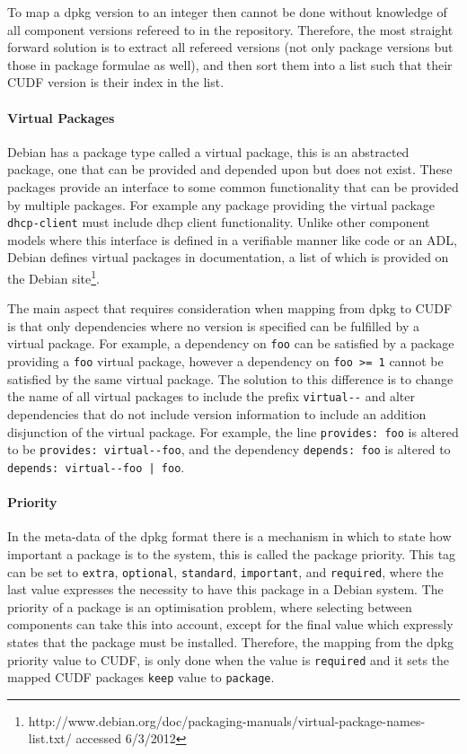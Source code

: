To map a dpkg version to an integer then cannot be done without knowledge of all component versions refereed to in the repository.
Therefore, the most straight forward solution is to extract all refereed versions (not only package versions but those in package formulae as well),
and then sort them into a list such that their CUDF version is their index in the list.

\paragraph{Virtual Packages}
Debian has a package type called a virtual package, this is an abstracted package, one that can be provided and depended upon but does not exist.
These packages provide an interface to some common functionality that can be provided by multiple packages.
For example any package providing the virtual package \verb+dhcp-client+ must include dhcp client functionality. 
Unlike other component models where this interface is defined in a verifiable manner like code or an ADL,
Debian defines virtual packages in documentation, a list of which is provided on the Debian site\footnote{http://www.debian.org/doc/packaging-manuals/virtual-package-names-list.txt/ accessed 6/3/2012}.

The main aspect that requires consideration when mapping from dpkg to CUDF is that only dependencies where no version is specified can be fulfilled by a virtual package.
For example, a dependency on \verb+foo+ can be satisfied by a package providing a \verb+foo+ virtual package, 
however a dependency on \verb+foo >= 1+ cannot be satisfied by the same virtual package. 
The solution to this difference is to change the name of all virtual packages to include the prefix \verb+virtual--+ and 
alter dependencies that do not include version information to include an addition disjunction of the virtual package.
For example, the line \verb+provides: foo+ is altered to be \verb+provides: virtual--foo+, 
and the dependency \verb+depends: foo+ is altered to \verb+depends: virtual--foo | foo+.

\paragraph{Priority}
In the meta-data of the dpkg format there is a mechanism in which to state how important a package is to the system, this is called the package priority.
This tag can be set to \verb+extra+, \verb+optional+, \verb+standard+, \verb+important+, and \verb+required+, where the last value expresses the necessity to have this package in a Debian system.
The priority of a package is an optimisation problem, where selecting between components can take this into account, 
except for the final value which expressly states that the package must be installed.
Therefore, the mapping from the dpkg priority value to CUDF, is only done when the value is \verb+required+ and it sets the mapped CUDF packages \verb+keep+ value to \verb+package+.


